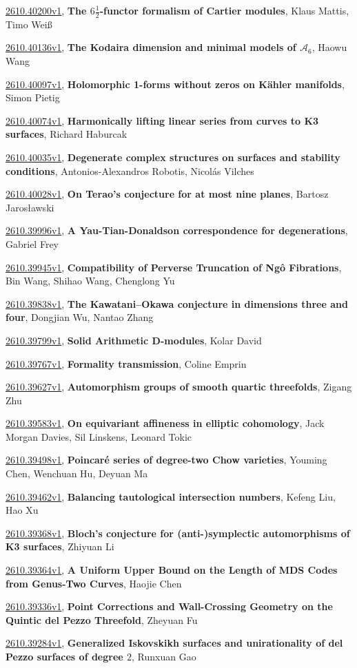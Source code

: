\documentclass[9pt, a4paper]{article}
\theoremstyle{plain}
\theoremstyle{definition}
\theoremstyle{remark}
\newcommand{\arxiv}[3]{\href{https://arxiv.org/abs/#1}{#1}, \textbf{\textcolor{arxivblue}{#2}}, #3}
\begin{document}
\arxiv{2610.40200v1}{The $6\frac{1}{2}$-functor formalism of Cartier modules}{Klaus Mattis, Timo Weiß}

\arxiv{2610.40136v1}{The Kodaira dimension and minimal models of $\mathcal{A}_6$}{Haowu Wang}

\arxiv{2610.40097v1}{Holomorphic 1-forms without zeros on Kähler manifolds}{Simon Pietig}

\arxiv{2610.40074v1}{Harmonically lifting linear series from curves to K3 surfaces}{Richard Haburcak}

\arxiv{2610.40035v1}{Degenerate complex structures on surfaces and stability conditions}{Antonios-Alexandros Robotis, Nicolás Vilches}

\arxiv{2610.40028v1}{On Terao's conjecture for at most nine planes}{Bartosz Jarosławski}

\arxiv{2610.39996v1}{A Yau-Tian-Donaldson correspondence for degenerations}{Gabriel Frey}

\arxiv{2610.39945v1}{Compatibility of Perverse Truncation of Ngô Fibrations}{Bin Wang, Shihao Wang, Chenglong Yu}

\arxiv{2610.39838v1}{The Kawatani--Okawa conjecture in dimensions three and four}{Dongjian Wu, Nantao Zhang}

\arxiv{2610.39799v1}{Solid Arithmetic D-modules}{Kolar David}

\arxiv{2610.39767v1}{Formality transmission}{Coline Emprin}

\arxiv{2610.39627v1}{Automorphism groups of smooth quartic threefolds}{Zigang Zhu}

\arxiv{2610.39583v1}{On equivariant affineness in elliptic cohomology}{Jack Morgan Davies, Sil Linskens, Leonard Tokic}

\arxiv{2610.39498v1}{Poincaré series of degree-two Chow varieties}{Youming Chen, Wenchuan Hu, Deyuan Ma}

\arxiv{2610.39462v1}{Balancing tautological intersection numbers}{Kefeng Liu, Hao Xu}

\arxiv{2610.39368v1}{Bloch's conjecture for (anti-)symplectic automorphisms of K3 surfaces}{Zhiyuan Li}

\arxiv{2610.39364v1}{A Uniform Upper Bound on the Length of MDS Codes from Genus-Two Curves}{Haojie Chen}

\arxiv{2610.39336v1}{Point Corrections and Wall-Crossing Geometry on the Quintic del Pezzo Threefold}{Zheyuan Fu}

\arxiv{2610.39284v1}{Generalized Iskovskikh surfaces and unirationality of del Pezzo surfaces of degree $2$}{Runxuan Gao}
\end{document}
